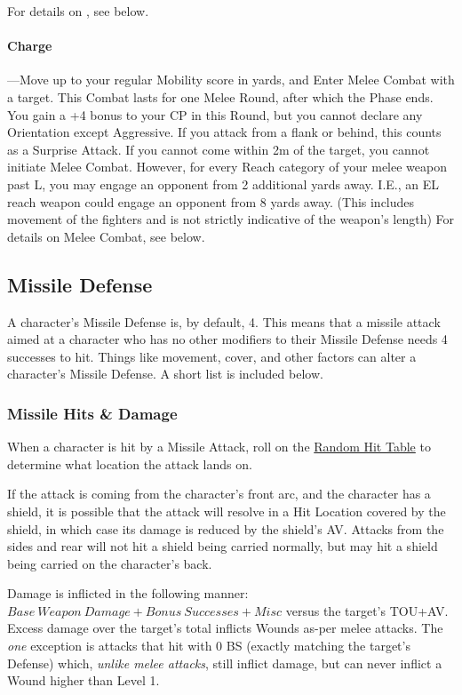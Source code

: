 \documentclass[oneside,11pt,english]{book}
\begin{document}
For details on , see below.

\paragraph{\label{par:Charge} Charge}---\quad Move up to your regular Mobility score in yards, and Enter Melee Combat with a target. This
Combat lasts for one Melee Round, after which the Phase ends. You gain a +4 bonus to your CP in this
Round, but you cannot declare any Orientation except Aggressive. If you attack from a flank or
behind, this counts as a Surprise Attack. If you cannot come within 2m of the target, you cannot initiate
Melee Combat. However, for every Reach category of your melee weapon past L, you may engage an
opponent from 2 additional yards away. I.E., an EL reach weapon could engage an opponent from 8 yards
away. (This includes movement of the fighters and is not strictly indicative of the weapon’s length)
For details on Melee Combat, see below.

\subsection{Missile Defense}
A character’s Missile Defense is, by default, 4. This means that a missile attack aimed at a character who
has no other modifiers to their Missile Defense needs 4 successes to hit. Things like movement, cover,
and other factors can alter a character’s Missile Defense. A short list is included below.
\subsubsection{Missile Hits \& Damage}
When a character is hit by a Missile Attack, roll on the \hyperref[tab:Missile
Target Zones]{Random Hit Table} to determine what location the attack lands on.

If the attack is coming from the character’s front arc, and the character has a
shield, it is possible that the attack will resolve in a Hit Location covered by
the shield, in which case its damage is reduced by the shield’s AV. Attacks from
the sides and rear will not hit a shield being carried normally, but may hit a
shield being carried on the character’s back. 

Damage is inflicted in the following manner:
$Base~Weapon~Damage+Bonus~Successes+Misc$ versus the target’s TOU+AV. Excess
damage over the target’s total inflicts Wounds as-per melee attacks. The
\emph{one} exception is attacks that hit with 0 BS (exactly matching the
target’s Defense) which, \emph{unlike melee attacks}, still inflict damage, but
can never inflict a Wound higher than Level 1.  
\end{document}
